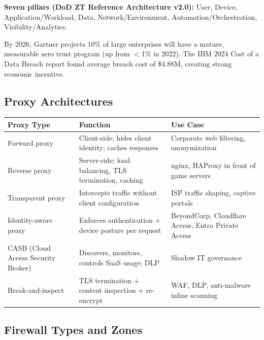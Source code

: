 \documentclass[11pt,letterpaper]{article}
\newcommand{\thead}[1]{\cellcolor{TableHead}\textbf{\sffamily\color{white}\small #1}}
\newcommand{\altrow}{\rowcolor{TableAlt}}
\begin{document}
\textbf{Seven pillars (DoD ZT Reference Architecture v2.0):} User, Device, Application/Workload, Data, Network/Environment, Automation/Orchestration, Visibility/Analytics.

By 2026, Gartner projects 10\% of large enterprises will have a mature, measurable zero trust program (up from $<$1\% in 2022). The IBM 2024 Cost of a Data Breach report found average breach cost of \$4.88M, creating strong economic incentive.

\subsection{Proxy Architectures}

\begin{longtable}{p{3.5cm}p{5cm}p{3.5cm}}
\toprule
\thead{Proxy Type} & \thead{Function} & \thead{Use Case} \\
\midrule
\endhead
Forward proxy & Client-side; hides client identity; caches responses & Corporate web filtering, anonymization \\
\altrow Reverse proxy & Server-side; load balancing, TLS termination, caching & nginx, HAProxy in front of game servers \\
Transparent proxy & Intercepts traffic without client configuration & ISP traffic shaping, captive portals \\
\altrow Identity-aware proxy & Enforces authentication + device posture per request & BeyondCorp, Cloudflare Access, Entra Private Access \\
CASB (Cloud Access Security Broker) & Discovers, monitors, controls SaaS usage; DLP & Shadow IT governance \\
\altrow Break-and-inspect & TLS termination + content inspection + re-encrypt & WAF, DLP, anti-malware inline scanning \\
\bottomrule
\end{longtable}

\subsection{Firewall Types and Zones}
\end{document}

